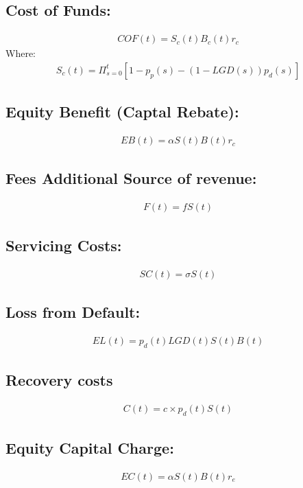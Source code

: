 \documentclass[12pt]{book}
\begin{document}
\subsection{  Cost of Funds: }
\begin{align}
COF(t) = S_c(t)B_c(t)r_c
\end{align}
Where: 
\begin{align}
S_c(t)= \Pi_{s=0}^t [1- p_p(s)-(1-LGD(s))p_d(s) ]
\end{align}

\subsection{ Equity Benefit (Captal Rebate): }
\begin{align}
EB(t) = \alpha S(t)B(t) r_c
\end{align}

\subsection{ Fees Additional Source of revenue: }
\begin{align}
F(t) = f S(t)
\end{align}

\subsection{ Servicing Costs: }
\begin{align}
SC(t) =  \sigma S(t)
\end{align}

\subsection{ Loss from Default: }
\begin{align}
EL(t) =  p_d(t)LGD(t)S(t)B(t) 
\end{align}
\subsection{Recovery costs}
\begin{align}
C(t) = c\times p_d(t) S(t)
\end{align}

\subsection{ Equity Capital Charge: }
\begin{align}
 EC(t) =  \alpha S(t)B(t) r_e
\end{align}
\end{document}
